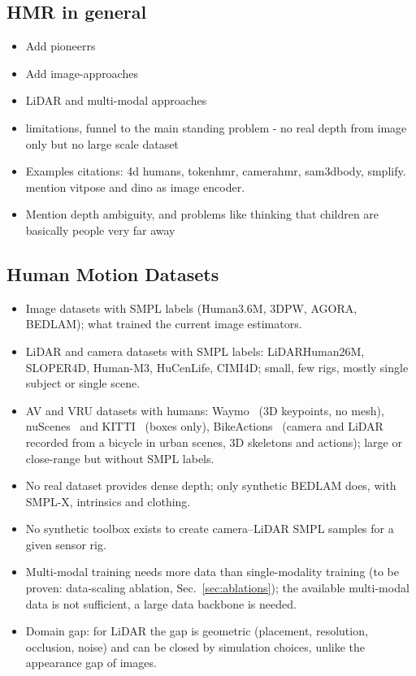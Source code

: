 \documentclass{egpubl}
\begin{document}
\subsection{HMR in general}
\begin{itemize}
  \item Add pioneerrs
  \item Add image-approaches
  \item LiDAR and multi-modal approaches
  \item limitations, funnel to the main standing problem - no real depth from image only but no large scale dataset
  \item Examples citations: 4d humans, tokenhmr, camerahmr, sam3dbody, smplify. mention vitpose and dino as image encoder.
  \item Mention depth ambiguity, and problems like thinking that children are basically people very far away 
\end{itemize}

\subsection{Human Motion Datasets}
\begin{itemize}
  \item Image datasets with SMPL labels (Human3.6M, 3DPW, AGORA, BEDLAM);
    what trained the current image estimators.
  \item LiDAR and camera datasets with SMPL labels: LiDARHuman26M,
    SLOPER4D, Human-M3, HuCenLife, CIMI4D; small, few rigs, mostly
    single subject or single scene.
  \item AV and VRU datasets with humans: Waymo~\cite{sun2020waymo,zheng2022waymokeypoints}
    (3D keypoints, no mesh), nuScenes~\cite{caesar2020nuscenes} and
    KITTI~\cite{geiger2012kitti} (boxes only),
    BikeActions~\cite{buettner_icpr2026_bikeactions} (camera and LiDAR recorded
    from a bicycle in urban scenes, 3D skeletons and actions); large or
    close-range but without SMPL labels.
  \item No real dataset provides dense depth; only synthetic BEDLAM does,
    with SMPL-X, intrinsics and clothing.
  \item No synthetic toolbox exists to create camera--LiDAR SMPL samples
    for a given sensor rig.
  \item Multi-modal training needs more data than single-modality training
    (to be proven: data-scaling ablation, Sec.~\ref{sec:ablations});
    the available multi-modal data is not sufficient, a large data
    backbone is needed.
  \item Domain gap: for LiDAR the gap is geometric (placement, resolution,
    occlusion, noise) and can be closed by simulation choices, unlike the
    appearance gap of images.
\end{itemize}
\end{document}
